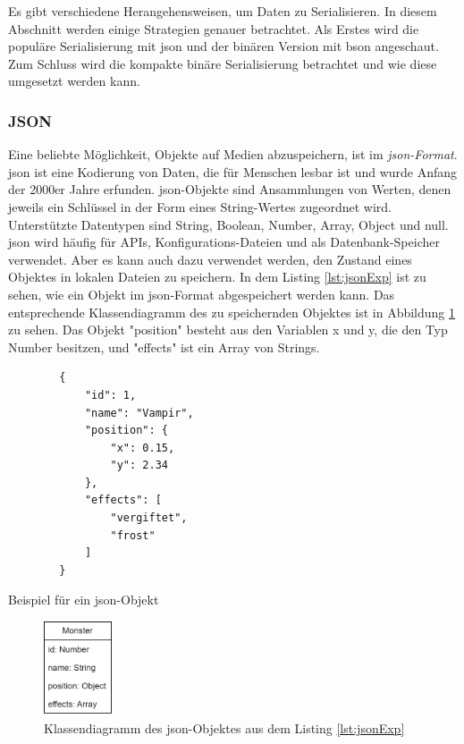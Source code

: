 Es gibt verschiedene Herangehensweisen, um Daten zu Serialisieren. In diesem Abschnitt werden einige Strategien genauer betrachtet. Als Erstes wird die populäre Serialisierung mit \ac{json}\cite{prokurainnovationsReasonJSON} und der binären Version mit \ac{bson} angeschaut. Zum Schluss wird die kompakte binäre Serialisierung betrachtet und wie diese umgesetzt werden kann.

\subsubsection{JSON}
Eine beliebte Möglichkeit, Objekte auf Medien abzuspeichern, ist im \textit{\ac{json}-Format}.\cite{prokurainnovationsReasonJSON} \ac{json} ist eine Kodierung von Daten, die für Menschen lesbar ist und wurde Anfang der 2000er Jahre erfunden.\cite{toptalDeepLookJson} \ac{json}-Objekte sind Ansammlungen von Werten, denen jeweils ein Schlüssel in der Form eines String-Wertes zugeordnet wird. Unterstützte Datentypen sind String, Boolean, Number, Array, Object und null. \ac{json} wird häufig für APIs, Konfigurations-Dateien und als Datenbank-Speicher verwendet. Aber es kann auch dazu verwendet werden, den Zustand eines Objektes in lokalen Dateien zu speichern.\cite{mongodbJSONBSON} In dem Listing \ref{lst:jsonExp} ist zu sehen, wie ein Objekt im \ac{json}-Format abgespeichert werden kann. Das entsprechende Klassendiagramm des zu speichernden Objektes ist in Abbildung \ref{fig:monsterBspKlasse} zu sehen. Das Objekt "position" besteht aus den Variablen x und y, die den Typ Number besitzen, und "effects" ist ein Array von Strings. 

\begin{listing}[htp]
    \begin{verbatim}
        {
            "id": 1,
            "name": "Vampir",
            "position": {
                "x": 0.15,
                "y": 2.34
            },
            "effects": [
                "vergiftet", 
                "frost"
            ]
        }
    \end{verbatim}
    \caption{Beispiel für ein \ac{json}-Objekt}
    \label{lst:jsonExp}
\end{listing}

\begin{figure}[htp]
    \centering
    \includegraphics[width=0.18\textwidth]{images/MonsterBspKlasse.png}
    \caption{Klassendiagramm des \ac{json}-Objektes aus dem Listing \ref{lst:jsonExp}}
    \label{fig:monsterBspKlasse}
\end{figure}

